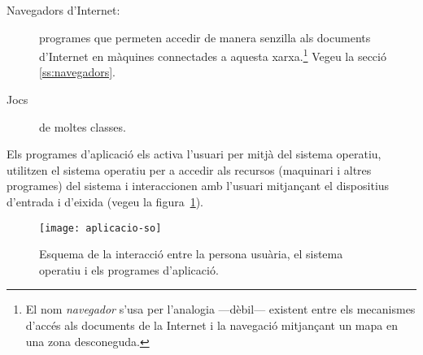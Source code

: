\begin{description}
\begin{description}
\begin{description}
    \item[Navegadors d'Internet:] \label{pg:navegadors} programes que
      permeten accedir de manera senzilla als documents d'Internet en
      màquines connectades a aquesta xarxa.\footnote{El nom
        \emph{navegador} s'usa per l'analogia ---dèbil--- existent
        entre els mecanismes d'accés als documents de la Internet i la
        navegació mitjançant un mapa en una zona desconeguda.}  Vegeu
      la secció \ref{ss:navegadors}.
    \item[Jocs] de moltes classes.
    \end{description}
  \end{description}
  Els programes d'aplicació els activa l'usuari per mitjà del
  sistema operatiu, utilitzen el sistema operatiu per a accedir
  als recursos (maquinari i altres programes) del sistema i
  interaccionen amb l'usuari mitjançant el dispositius d'entrada
  i d'eixida (vegeu la figura~\ref{fg:aplicacio-so}).
\end{description}

\begin{figure}
  \centering
  \texttt{[image: aplicacio-so]}
  \caption{Esquema de la interacció entre la persona usuària, el
    sistema operatiu i els programes d'aplicació.}
  \label{fg:aplicacio-so}
\end{figure}


